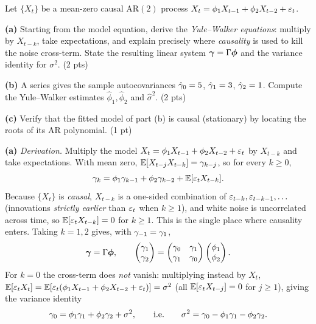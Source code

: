\documentclass[11pt]{article}
\begin{document}

\statementstart
Let $\{X_t\}$ be a mean-zero causal $\mathrm{AR}(2)$ process
$X_t=\phi_1X_{t-1}+\phi_2X_{t-2}+\varepsilon_t$.

\textbf{(a)} Starting from the model equation, derive the \emph{Yule--Walker equations}: multiply by $X_{t-k}$, take expectations, and explain precisely where \emph{causality} is used to kill the noise cross-term. State the resulting linear system $\boldsymbol{\gamma}=\Gamma\boldsymbol\phi$ and the variance identity for $\sigma^2$. \hfill(2 pts)

\textbf{(b)} A series gives the sample autocovariances $\hat{\gamma}_0=5$, $\hat{\gamma}_1=3$, $\hat{\gamma}_2=1$. Compute the Yule--Walker estimates $\hat\phi_1,\hat\phi_2$ and $\hat\sigma^2$. \hfill(2 pts)

\textbf{(c)} Verify that the fitted model of part (b) is causal (stationary) by locating the roots of its AR polynomial. \hfill(1 pt)
\statementend

\textbf{(a)} \emph{Derivation.} Multiply the model
$X_t=\phi_1X_{t-1}+\phi_2X_{t-2}+\varepsilon_t$ by $X_{t-k}$ and take expectations. With
mean zero, $\mathbb{E}[X_{t-j}X_{t-k}]=\gamma_{k-j}$, so for every $k\ge0$,
\[
\gamma_k=\phi_1\gamma_{k-1}+\phi_2\gamma_{k-2}+\mathbb{E}[\varepsilon_tX_{t-k}].
\]
Because $\{X_t\}$ is \emph{causal}, $X_{t-k}$ is a one-sided combination of
$\varepsilon_{t-k},\varepsilon_{t-k-1},\dots$ (innovations \emph{strictly earlier} than
$\varepsilon_t$ when $k\ge1$), and white noise is uncorrelated across time, so
$\mathbb{E}[\varepsilon_tX_{t-k}]=0$ for $k\ge1$. This is the single place where causality
enters. Taking $k=1,2$ gives, with $\gamma_{-1}=\gamma_1$,
\[
\boldsymbol{\gamma}=\Gamma\boldsymbol\phi,\qquad
\begin{pmatrix}\gamma_1\\ \gamma_2\end{pmatrix}
=\begin{pmatrix}\gamma_0 & \gamma_1\\ \gamma_1 & \gamma_0\end{pmatrix}
\begin{pmatrix}\phi_1\\ \phi_2\end{pmatrix}.
\]
For $k=0$ the cross-term does \emph{not} vanish: multiplying instead by $X_t$,
$\mathbb{E}[\varepsilon_tX_t]=\mathbb{E}[\varepsilon_t(\phi_1X_{t-1}+\phi_2X_{t-2}+\varepsilon_t)]=\sigma^2$
(all $\mathbb{E}[\varepsilon_tX_{t-j}]=0$ for $j\ge1$), giving the variance identity
\[
\gamma_0=\phi_1\gamma_1+\phi_2\gamma_2+\sigma^2,
\qquad\text{i.e.}\qquad
\sigma^2=\gamma_0-\phi_1\gamma_1-\phi_2\gamma_2 .
\]
\end{document}

